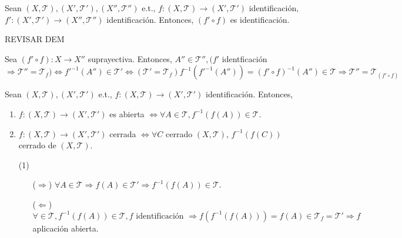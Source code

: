 \begin{prop}
  Sean $( X, \mathcal{T} ), ( X', \mathcal{T}' ), ( X'', \mathcal{T}'' )$ e.t., $f: ( X, \mathcal{T} ) \to ( X', \mathcal{T}' )$ identificación, $f': ( X', \mathcal{T}' ) \to ( X'', \mathcal{T}'' )$ identificación. Entonces, $(f' \circ f)$ es identificación.
\end{prop}

REVISAR DEM

\begin{dem}
  Sea $(f' \circ f): X \to X''$ suprayectiva. Entonces, $A'' \in \mathcal{T}'', (f'$ identficación $\Rightarrow \mathcal{T}'' = \mathcal{T}_{f}) \Leftrightarrow f'^{-1}(A'') \in \mathcal{T}' \Leftrightarrow (\mathcal{T}' = \mathcal{T}_{f}) f^{-1}(f'^{-1}(A'')) = (f' \circ f)^{-1}(A'') \in \mathcal{T} \Rightarrow \mathcal{T}'' = \mathcal{T}_{(f' \circ f)}$
\end{dem}

\begin{prop}
  Sean $( X, \mathcal{T} ), ( X', \mathcal{T}' )$ e.t., $f: ( X, \mathcal{T} ) \to ( X', \mathcal{T}' )$ identificación. Entonces, 
  \begin{enumerate}[label=(\roman*)]
    \item $f: ( X, \mathcal{T} ) \to ( X', \mathcal{T}' )$ es abierta $\Leftrightarrow \forall A \in \mathcal{T}, f^{-1}(f(A)) \in \mathcal{T}$.
    \item $f: ( X, \mathcal{T} ) \to ( X', \mathcal{T}' )$ cerrada $\Leftrightarrow \forall C $ cerrado $( X, \mathcal{T} )$, $ f^{-1}(f(C))$ cerrado de $( X, \mathcal{T} )$.
  \end{enumerate}
\end{prop}

\begin{dem}
  \begin{enumerate}[label=(\roman*)]
    \item []
    \item [(1)]
      \begin{enumerate}[label=(\roman*)]
        \item [($\Rightarrow$)] $\forall A \in \mathcal{T} \Rightarrow f(A) \in \mathcal{T}' \Rightarrow f^{-1}(f(A)) \in \mathcal{T}$.
      \item [($\Leftarrow$)] $\forall \in \mathcal{T}, f^{-1}(f(A)) \in \mathcal{T}, f \text{ identificación } \Rightarrow  f(f^{-1}(f(A))) = f(A) \in \mathcal{T}_{f} = \mathcal{T}' \Rightarrow f$ aplicación abierta.
      \end{enumerate}
  \end{enumerate}
\end{dem}

